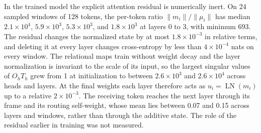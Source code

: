 \documentclass[twoside,11pt]{article}
\begin{document}
In the trained model the explicit attention residual is numerically inert. On 24 sampled windows of 128 tokens, the per-token ratio $\|m_i\|/\|\mu_i\|$ has median $2.1\times10^4$, $5.9\times10^3$, $5.3\times10^3$, and $1.8\times10^3$ at layers 0 to 3, with minimum 693. The residual changes the normalized state by at most $1.8\times10^{-3}$ in relative terms, and deleting it at every layer changes cross-entropy by less than $4\times10^{-4}$ nats on every window. The relational maps train without weight decay and the layer normalization is invariant to the scale of its input, so the largest singular values of $O_hT_h$ grew from 1 at initialization to between $2.6\times10^3$ and $2.6\times10^4$ across heads and layers. At the final weights each layer therefore acts as $u_i=\operatorname{LN}(m_i)$ up to a relative $2\times10^{-3}$. The receiving token reaches the next layer through its frame and its routing self-weight, whose mean lies between 0.07 and 0.15 across layers and windows, rather than through the additive state. The role of the residual earlier in training was not measured.
\end{document}
